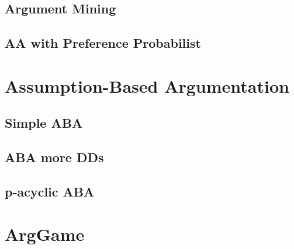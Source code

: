 	\subsection{Argument Mining}
	\subsection{AA with Preference Probabilist}

\section{Assumption-Based Argumentation}

	\subsection{Simple ABA}
	\subsection{ABA more DDs}
	\subsection{p-acyclic ABA}

\section{ArgGame}
